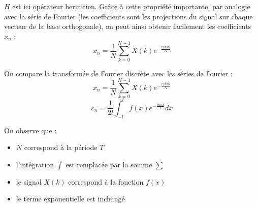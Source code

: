 \documentclass{report}
\begin{document}
		$H$ est ici opérateur hermitien. Grâce à cette propriété importante, par analogie avec la série de Fourier (les coefficients sont les projections du signal sur chaque vecteur de la base orthogonale), on peut ainsi obtenir facilement les coefficients $x_n$ :
		\begin{displaymath} 
			x_n=\frac{1}{N}\sum_{k=0}^{N-1}X(k)e^{-\frac{i2\pi kn}{N}}
		\end{displaymath}

		On compare la transformée de Fourier discrète avec les séries de Fourier :
		\begin{displaymath}
			x_n		=	\frac{1}{N}\sum_{k=0}^{N-1}X(k)e^{-\frac{i2\pi kn}{N}}
		\end{displaymath}
		\begin{displaymath}
			c_n 	=	\frac{1}{2l}\int_{-l}^{l}f(x)e^{-\frac{in\pi x}{l}}dx
		\end{displaymath}

		On observe que :
		\begin{itemize}
			\item $N$ correspond à la période $T$
			\item l'intégration $\int$ est remplacée par la somme $\sum$
			\item le signal $X(k)$ correspond à la fonction $f(x)$
			\item le terme exponentielle est inchangé
		\end{itemize}
\end{document}
